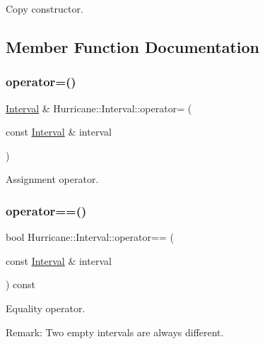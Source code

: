 Copy constructor. 

\subsection{Member Function Documentation}
\mbox{\label{classHurricane_1_1Interval_a6d9eb898fa89218cec031f28d69a7d95}} 
\subsubsection{\texorpdfstring{operator=()}{operator=()}}
{\footnotesize\ttfamily \mbox{\hyperlink{classHurricane_1_1Interval}{Interval}} \& Hurricane\+::\+Interval\+::operator= (\begin{DoxyParamCaption}\item[{const \mbox{\hyperlink{classHurricane_1_1Interval}{Interval}} \&}]{interval }\end{DoxyParamCaption})}

Assignment operator. \mbox{\label{classHurricane_1_1Interval_ad10b5fbbeb4531915a6031353e148edc}} 
\subsubsection{\texorpdfstring{operator==()}{operator==()}}
{\footnotesize\ttfamily bool Hurricane\+::\+Interval\+::operator== (\begin{DoxyParamCaption}\item[{const \mbox{\hyperlink{classHurricane_1_1Interval}{Interval}} \&}]{interval }\end{DoxyParamCaption}) const}

Equality operator.

\begin{DoxyParagraph}{Remark\+: Two empty intervals are always different. }

\end{DoxyParagraph}
\mbox{\label{classHurricane_1_1Interval_a2703ebb1e70d93d96ae8e29748c53d14}} 
